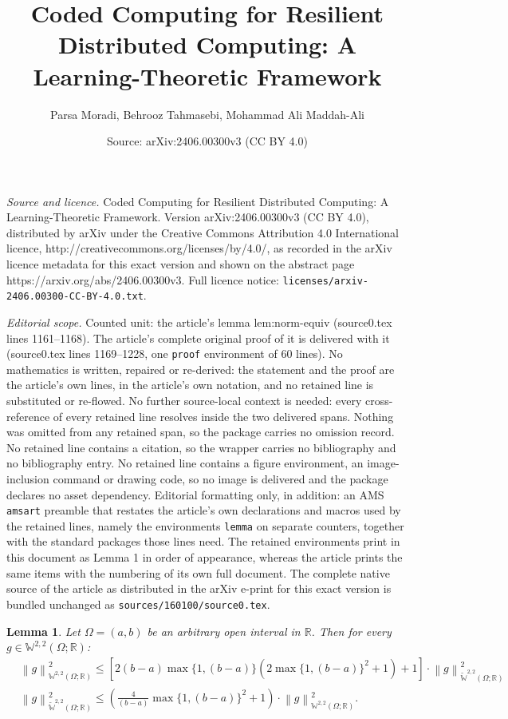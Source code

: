 \documentclass[10pt,a4paper]{amsart}
\title{Coded Computing for Resilient Distributed Computing: A Learning-Theoretic Framework}
\author{Parsa Moradi, Behrooz Tahmasebi, Mohammad Ali Maddah-Ali}
\date{Source: arXiv:2406.00300v3 (CC BY 4.0)}
\newtheorem{lemma}{Lemma}
\newcommand{\norm}[1]{\left\lVert#1\right\rVert}
\newcommand{\sob}[2]{\mathbb{W}^{#1,#2}\left(\Omega; \mathbb{R}\right)}
\newcommand{\sobeq}[2]{\widetilde{\mathbb{W}}^{#1,#2}\left(\Omega; \mathbb{R}\right)}
\begin{document}
\maketitle

\noindent\emph{Source and licence.} Coded Computing for Resilient Distributed Computing: A Learning-Theoretic Framework. Version arXiv:2406.00300v3 (CC BY 4.0), distributed by arXiv under the Creative Commons Attribution 4.0 International licence, http://creativecommons.org/licenses/by/4.0/, as recorded in the arXiv licence metadata for this exact version and shown on the abstract page https://arxiv.org/abs/2406.00300v3. Full licence notice: \texttt{licenses/arxiv-2406.00300-CC-BY-4.0.txt}.\par\smallskip

\noindent\textit{Editorial scope.} Counted unit: the article's lemma lem:norm-equiv (source0.tex lines 1161--1168). The article's complete original proof of it is delivered with it (source0.tex lines 1169--1228, one \texttt{proof} environment of 60 lines). No mathematics is written, repaired or re-derived: the statement and the proof are the article's own lines, in the article's own notation, and no retained line is substituted or re-flowed.  No further source-local context is needed: every cross-reference of every retained line resolves inside the two delivered spans.  Nothing was omitted from any retained span, so the package carries no omission record.  No retained line contains a citation, so the wrapper carries no bibliography and no bibliography entry.  No retained line contains a figure environment, an image-inclusion command or drawing code, so no image is delivered and the package declares no asset dependency.  Editorial formatting only, in addition: an AMS \texttt{amsart} preamble that restates the article's own declarations and macros used by the retained lines, namely the environments \texttt{lemma} on separate counters, together with the standard packages those lines need.  The retained environments print in this document as Lemma 1 in order of appearance, whereas the article prints the same items with the numbering of its own full document.  The complete native source of the article as distributed in the arXiv e-print for this exact version is bundled unchanged as \texttt{sources/160100/source0.tex}.
\begin{lemma}\label{lem:norm-equiv}
    Let $\Omega = (a,b)$ be an arbitrary open interval in $\mathbb{R}$. Then for every $g \in \sob{2}{2}$:
    \begin{align}
        \label{lem:norm-equiv1}
        &\norm{g}^2_{\sob{2}{2}}\leqslant \left[2(b-a)\max\{1, (b-a)\} \left (2\max\{1, (b-a)\}^2 + 1 \right) +1\right] \cdot\norm{g}^2_{\sobeq{2}{2}} \\ \label{lem:norm-equiv2}
        &\norm{g}^2_{\sobeq{2}{2}}\leqslant \left(\frac{4}{(b-a)}\max\{1, (b-a)\}^2 + 1\right)\cdot \norm{g}^2_{\sob{2}{2}}.
    \end{align}
\end{lemma}
\end{document}
